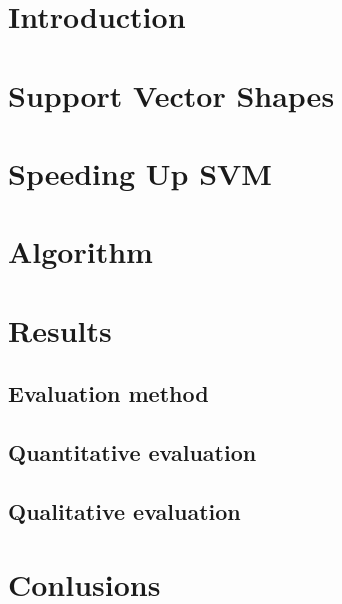 \documentclass[12pt]{article}
\begin{document}
\maketitle

\section{Introduction}


\section{Support Vector Shapes}



\section{Speeding Up SVM}


\section{Algorithm}


\section{Results}
\subsection{Evaluation method}

\subsection{Quantitative evaluation}

\subsection{Qualitative evaluation}



\section{Conlusions}




\end{document}
